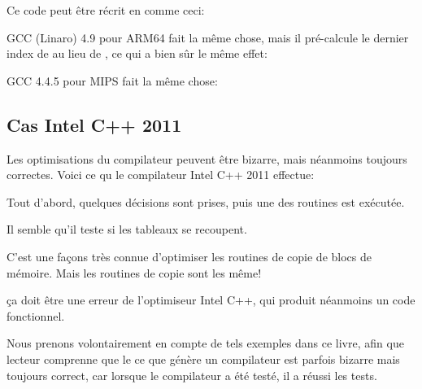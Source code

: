 Ce code peut être récrit en \CCpp comme ceci:



GCC (Linaro) 4.9 pour ARM64 fait la même chose, mais il pré-calcule le dernier index
de  au lieu de , ce qui a bien sûr le même effet:




GCC 4.4.5 pour MIPS fait la même chose:



\subsection{Cas Intel C++ 2011}
\myindex{\CompilerAnomaly}
\label{loops_iterators_loop_anomaly}

Les optimisations du compilateur peuvent être bizarre, mais néanmoins toujours correctes.
Voici ce qu le compilateur Intel C++ 2011 effectue:



Tout d'abord, quelques décisions sont prises, puis une des routines est exécutée.

Il semble qu'il teste si les tableaux se recoupent.

C'est une façons très connue d'optimiser les routines de copie de blocs de mémoire.
Mais les routines de copie sont les même!

ça doit être une erreur de l'optimiseur Intel C++, qui produit néanmoins un code
fonctionnel.

Nous prenons volontairement en compte de tels exemples dans ce livre, afin que lecteur
comprenne que le ce que génère un compilateur est parfois bizarre mais toujours correct,
car lorsque le compilateur a été testé, il a réussi les tests.

